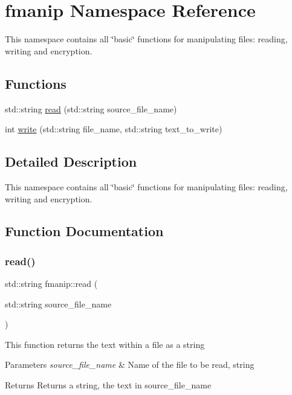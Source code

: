 \hypertarget{namespacefmanip}{}\section{fmanip Namespace Reference}
\label{namespacefmanip}


This namespace contains all \char`\"{}basic\char`\"{} functions for manipulating files\+: reading, writing and encryption.  


\subsection*{Functions}
\begin{DoxyCompactItemize}
\item 
std\+::string \hyperlink{namespacefmanip_a66b745d158684878cd4c8bc815c74849}{read} (std\+::string source\+\_\+file\+\_\+name)
\item 
int \hyperlink{namespacefmanip_af5012379267d8164747803e2ecaa1205}{write} (std\+::string file\+\_\+name, std\+::string text\+\_\+to\+\_\+write)
\end{DoxyCompactItemize}


\subsection{Detailed Description}
This namespace contains all \char`\"{}basic\char`\"{} functions for manipulating files\+: reading, writing and encryption. 

\subsection{Function Documentation}
\mbox{\label{namespacefmanip_a66b745d158684878cd4c8bc815c74849}} 
\subsubsection{\texorpdfstring{read()}{read()}}
{\footnotesize\ttfamily std\+::string fmanip\+::read (\begin{DoxyParamCaption}\item[{std\+::string}]{source\+\_\+file\+\_\+name }\end{DoxyParamCaption})}

This function returns the text within a file as a string 
\begin{DoxyParams}{Parameters}
{\em source\+\_\+file\+\_\+name} & Name of the file to be read, string \\
\hline
\end{DoxyParams}
\begin{DoxyReturn}{Returns}
Returns a string, the text in source\+\_\+file\+\_\+name 
\end{DoxyReturn}
\mbox{\label{namespacefmanip_af5012379267d8164747803e2ecaa1205}} 
